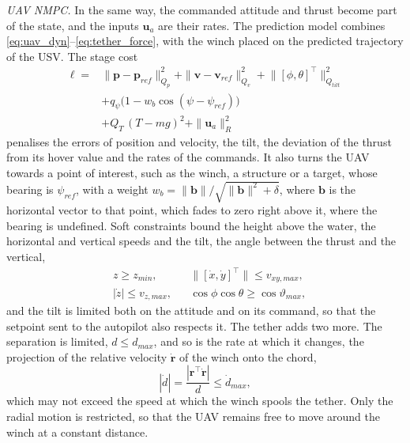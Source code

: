 \textit{UAV NMPC.} In the same way, the commanded attitude and thrust become part of the state, and the inputs $\mathbf{u}_a$ are their rates. The prediction model combines \eqref{eq:uav_dyn}--\eqref{eq:tether_force}, with the winch placed on the predicted trajectory of the USV. The stage cost
\begin{equation}
\begin{aligned}
    \ell = {} & \|\mathbf{p}-\mathbf{p}_{ref}\|^2_{Q_p} + \|\mathbf{v}-\mathbf{v}_{ref}\|^2_{Q_v} + \big\|[\phi,\theta]^\top\big\|^2_{Q_{tilt}} \\
    & + q_\psi\big(1 - w_b\cos(\psi-\psi_{ref})\big) \\
    & + Q_T\,(T-mg)^2 + \|\mathbf{u}_a\|^2_R
\end{aligned}
\label{eq:uav_cost}
\end{equation}
penalises the errors of position and velocity, the tilt, the deviation of the thrust from its hover value and the rates of the commands. It also turns the UAV towards a point of interest, such as the winch, a structure or a target, whose bearing is $\psi_{ref}$, with a weight $w_b = \|\mathbf{b}\|/\sqrt{\|\mathbf{b}\|^2+\delta}$, where $\mathbf{b}$ is the horizontal vector to that point, which fades to zero right above it, where the bearing is undefined. Soft constraints bound the height above the water, the horizontal and vertical speeds and the tilt, the angle between the thrust and the vertical,
\begin{equation}
\begin{aligned}
    & z \ge z_{min}, && \big\|[\dot x,\dot y]^\top\big\| \le v_{xy,max}, \\
    & |\dot z| \le v_{z,max}, && \cos\phi\cos\theta \ge \cos\vartheta_{max},
\end{aligned}
    \label{eq:uav_bounds}
\end{equation}
and the tilt is limited both on the attitude and on its command, so that the setpoint sent to the autopilot also respects it. The tether adds two more. The separation is limited, $d \le d_{max}$, and so is the rate at which it changes, the projection of the relative velocity $\dot{\mathbf{r}}$ of the winch onto the chord,
\begin{equation}
    |\dot d| = \frac{|\mathbf{r}^\top\dot{\mathbf{r}}|}{d} \le \dot d_{max},
    \label{eq:uav_ddot}
\end{equation}
which may not exceed the speed at which the winch spools the tether. Only the radial motion is restricted, so that the UAV remains free to move around the winch at a constant distance.

